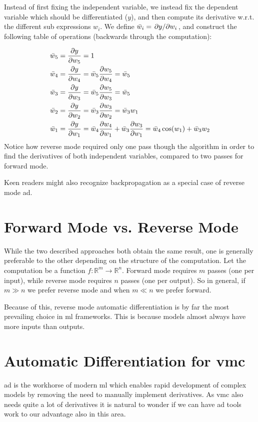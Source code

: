 \documentclass[Thesis.tex]{subfiles}
\begin{document}
Instead of first fixing the independent variable, we
instead fix the dependent variable which should be differentiated (\(y\)), and
then compute its derivative w.r.t. the different sub expressions $w_i$. We
define \(\bar w_i = \pdv*{y}{w_i}\), and construct the following table of
operations (backwards through the computation):

\begin{align*}
  \bar w_5 &= \pdv{y}{w_5} = 1\\
  \bar w_4 &= \pdv{y}{w_4} = \bar w_5\pdv{w_5}{w_4} = \bar w_5\\
  \bar w_3 &= \pdv{y}{w_3} = \bar w_5\pdv{w_5}{w_3} = \bar w_5\\
  \bar w_2 &= \pdv{y}{w_2} = \bar w_3\pdv{w_3}{w_2} = \bar w_3 w_1\\
  \bar w_1 &= \pdv{y}{w_1} = \bar w_4\pdv{w_4}{w_1} + \bar w_3 \pdv{w_3}{w_1}= \bar w_4 \cos(w_1) + \bar w_3w_2
\end{align*}
Notice how reverse mode required only one pass though the algorithm in order to
find the derivatives of both independent variables, compared to two passes for
forward mode.

Keen readers might also recognize backpropagation as a special case of reverse mode \gls{ad}.

\section{Forward Mode vs. Reverse Mode}

While the two described approaches both obtain the same result, one is generally
preferable to the other depending on the structure of the computation. Let the
computation be a function $f: \mathbb{R}^{m}\to\mathbb{R}^n$. Forward mode
requires $m$ passes (one per input), while reverse mode requires $n$ passes (one
per output). So in general, if $m \gg n$ we prefer reverse mode and when $m\ll
n$ we prefer forward.

Because of this, reverse mode automatic differentiation is by far the most
prevailing choice in \gls{ml} frameworks. This is because models almost always have
more inputs than outputs.

\section{Automatic Differentiation for \gls{vmc}}

\gls{ad} is the workhorse of modern \gls{ml} which enables rapid development of complex
models by removing the need to manually implement derivatives. As \gls{vmc} also needs
quite a lot of derivatives it is natural to wonder if we can have \gls{ad} tools work
to our advantage also in this area.
\end{document}
